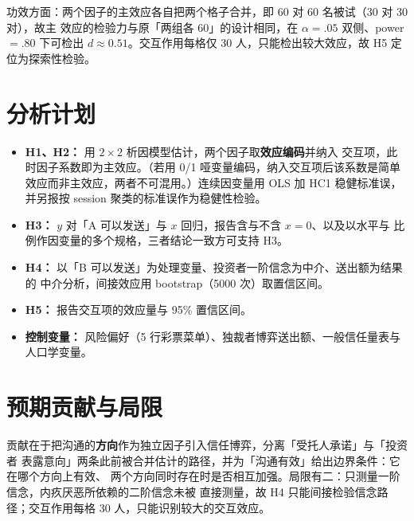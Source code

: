 \documentclass[10pt,a4paper]{ctexart}
\begin{document}
功效方面：两个因子的主效应各自把两个格子合并，即 60 对 60 名被试（30 对 30 对），故主
效应的检验力与原「两组各 60」的设计相同，在 $\alpha=.05$ 双侧、power$=.80$ 下可检出
$d\approx 0.51$。交互作用每格仅 30 人，只能检出较大效应，故 H5 定位为探索性检验。

\section{分析计划}

\begin{itemize}
  \item \textbf{H1、H2：} 用 $2\times2$ 析因模型估计，两个因子取\textbf{效应编码}并纳入
        交互项，此时因子系数即为主效应。（若用 0/1 哑变量编码，纳入交互项后该系数是简单
        效应而非主效应，两者不可混用。）连续因变量用 OLS 加 HC1 稳健标准误，并另报按
        session 聚类的标准误作为稳健性检验。
  \item \textbf{H3：} $y$ 对「A 可以发送」与 $x$ 回归，报告含与不含 $x=0$、以及以水平与
        比例作因变量的多个规格，三者结论一致方可支持 H3。
  \item \textbf{H4：} 以「B 可以发送」为处理变量、投资者一阶信念为中介、送出额为结果的
        中介分析，间接效应用 bootstrap（5000 次）取置信区间。
  \item \textbf{H5：} 报告交互项的效应量与 95\% 置信区间。
  \item \textbf{控制变量：} 风险偏好（5 行彩票菜单）、独裁者博弈送出额、一般信任量表与
        人口学变量。
\end{itemize}

\section{预期贡献与局限}

贡献在于把沟通的\textbf{方向}作为独立因子引入信任博弈，分离「受托人承诺」与「投资者
表露意向」两条此前被合并估计的路径，并为「沟通有效」给出边界条件：它在哪个方向上有效、
两个方向同时存在时是否相互加强。局限有二：只测量一阶信念，内疚厌恶所依赖的二阶信念未被
直接测量，故 H4 只能间接检验信念路径；交互作用每格 30 人，只能识别较大的交互效应。
\end{document}
